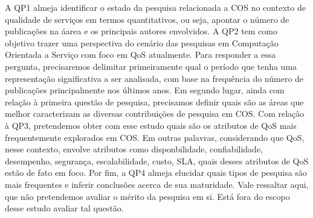 A QP1 almeja identificar o estado da pesquisa relacionada a COS no contexto de qualidade de servi\c{c}os em termos quantitativos, ou seja, apontar o n\'{u}mero de publica\c{c}\~{o}es na \'{a}area e os principais autores envolvidos. A QP2 tem como objetivo trazer uma perspectiva do cen\'{a}rio das pesquisas em Computa\c{c}\~{a}o Orientada a Servi\c{c}o com foco em QoS atualmente. Para responder a essa pergunta, precisaremos delimitar primeiramente qual o per\'{i}odo que tenha uma representa\c{c}\~{a}o significativa a ser analisada, com base na frequ\^{e}ncia do n\'{u}mero de publica\c{c}\~{o}es principalmente nos \'{u}ltimos anos. Em segundo lugar, ainda com rela\c{c}\~{a}o \`{a} primeira quest\~{a}o de pesquisa, precisamos definir quais s\~{a}o as \'{a}reas que melhor caracterizam as diversas contribui\c{c}\~{o}es de pesquisa em COS. Com rela\c{c}\~{a}o \`{a} QP3, pretendemos obter com esse estudo quais s\~{a}o os atributos de QoS mais frequentemente explorados em COS. Em outras palavras, considerando que QoS, nesse contexto, envolve atributos como disponbilidade, confiabilidade, desempenho, seguran\c{c}a, escalabilidade, custo, SLA, quais desses atributos de QoS est\~{a}o de fato em foco. Por fim, a QP4 almeja elucidar quais tipos de pesquisa s\~{a}o mais frequentes e inferir conclusões acerca de sua maturidade. Vale ressaltar aqui, que n\~{a}o pretendemos avaliar o m\'{e}rito da pesquisa em si. Est\'{a} fora do escopo desse estudo avaliar tal quest\~{a}o.


